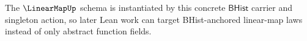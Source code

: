 The $\LinearMapUp$ schema is instantiated by this concrete $\mathsf{BHist}$
carrier and singleton action, so later Lean work can target BHist-anchored
linear-map laws instead of only abstract function fields.
